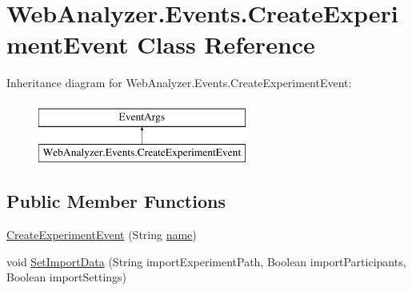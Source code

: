 \hypertarget{class_web_analyzer_1_1_events_1_1_create_experiment_event}{}\section{Web\+Analyzer.\+Events.\+Create\+Experiment\+Event Class Reference}
\label{class_web_analyzer_1_1_events_1_1_create_experiment_event}
Inheritance diagram for Web\+Analyzer.\+Events.\+Create\+Experiment\+Event\+:\begin{figure}[H]
\begin{center}
\leavevmode
\includegraphics[height=2.000000cm]{class_web_analyzer_1_1_events_1_1_create_experiment_event}
\end{center}
\end{figure}
\subsection*{Public Member Functions}
\begin{DoxyCompactItemize}
\item 
\hyperlink{class_web_analyzer_1_1_events_1_1_create_experiment_event_a5f3b337a20585c39e7e0470429807d23}{Create\+Experiment\+Event} (String \hyperlink{_u_i_2_h_t_m_l_resources_2js_2src_2create__experiment_8js_adac2bcb4f01b574cbc63fe8ee2c56bf0}{name})
\item 
void \hyperlink{class_web_analyzer_1_1_events_1_1_create_experiment_event_a4b2a92153369ad87f92fd19b1ae8398a}{Set\+Import\+Data} (String import\+Experiment\+Path, Boolean import\+Participants, Boolean import\+Settings)
\end{DoxyCompactItemize}
